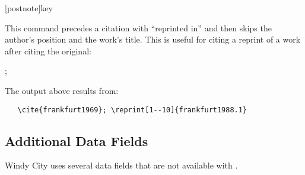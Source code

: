 \documentclass[11pt,letterpaper,oneside]{article}
\begin{document}
\begin{ltxsyntax}
[postnote]{key}

This command precedes a citation with ``reprinted in'' and then skips
the author's position and the work's title. This is useful for citing
a reprint of a work after citing the original:

\begin{citebib}
\item \cite{frankfurt1969}; 
\end{citebib}

\noindent The output above results from:

\begin{verbatim}
   \cite{frankfurt1969}; \reprint[1--10]{frankfurt1988.1}
\end{verbatim}

\end{ltxsyntax}

\subsection{Additional Data Fields}
\label{datafields}

Windy City uses several data fields that are not available with
\biblatex.
\end{document}
